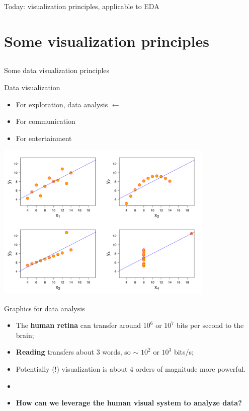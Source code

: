 \documentclass[xcolor=table,aspectratio=169]{beamer}
\begin{document}
\begin{frame}
  Today: visualization principles, applicable to EDA 
\end{frame}
\section{Some visualization principles}\subsection{}

\begin{frame}
  Some data visualization principles
\end{frame}

\begin{frame}
  {Data visualization}

  \begin{itemize}
    \item For exploration, data analysis $\leftarrow$
    \item For communication
    \item For entertainment
  \end{itemize}
\end{frame}

\begin{frame}{}
	\includegraphics[width=0.78\textwidth]{pics/anscombe.png}
\end{frame}

\begin{frame}{Graphics for data analysis}
  \begin{itemize}
    \item The \textbf{human retina} can transfer around $10^6$ or $10^7$ bits per second to the brain;
    \item \textbf{Reading} transfers about 3 words, so $\sim$ $10^2$ or $10^3$ bits/s;
    \item Potentially (!) visualization is about 4 orders of magnitude more powerful.
      \item[]
      \item[] \textbf{How can we leverage the human visual system to analyze data?}
  \end{itemize}
\end{frame}
\end{document}
